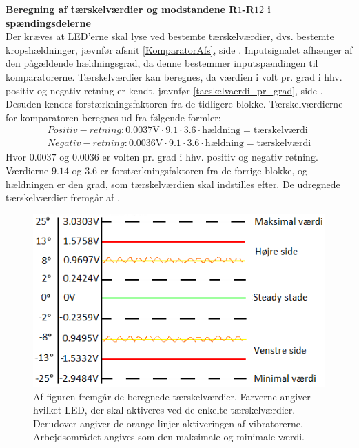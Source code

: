 \noindent\textbf{Beregning af tærskelværdier og modstandene R$1$-R$12$ i spændingsdelerne} \\
Der kræves at LED'erne skal lyse ved bestemte tærskelværdier, dvs. bestemte kropshældninger, jævnfør afsnit \ref{KomparatorAfs}, side \pageref{KomparatorAfs}. Inputsignalet afhænger af den pågældende hældningsgrad, da denne bestemmer inputspændingen til komparatorerne. Tærskelværdier kan beregnes, da værdien i volt pr. grad i hhv. positiv og negativ retning er kendt, jævnfør \eqref{taeskelvaerdi_pr_grad}, side \pageref{Sec_Pilot_Data}. Desuden kendes forstærkningsfaktoren fra de tidligere blokke. Tærskelværdierne for komparatoren beregnes ud fra følgende formler:
\begin{eqnarray} \label{pr_grad} 
Positiv-retning : 0.0037\text{V} \cdot 9.1 \cdot 3.6 \cdot \text{hældning} = \text{tærskelværdi} \\
Negativ-retning : 0.0036\text{V} \cdot 9.1 \cdot 3.6 \cdot \text{hældning} = \text{tærskelværdi}
\end{eqnarray}
\noindent Hvor $0.0037$ og $0.0036$ er volten pr. grad i hhv. positiv og negativ retning. Værdierne $9.14$ og $3.6$ er forstærkningsfaktoren fra de forrige blokke, og hældningen er den grad, som tærskelværdien skal indstilles efter. 
De udregnede tærskelværdier fremgår af . 
\begin{figure}[H]
	\centering
	\includegraphics[scale=1.]{figures/cProblemloesning/Taerskelvaerdier.PNG}
	\caption{Af figuren fremgår de beregnede tærskelværdier. Farverne angiver hvilket LED, der skal aktiveres ved de enkelte tærskelværdier. Derudover angiver de orange linjer aktiveringen af vibratorerne. Arbejdsområdet angives som den maksimale og minimale værdi.}
	\label{fig:taerskelvaerdier}
\end{figure}

